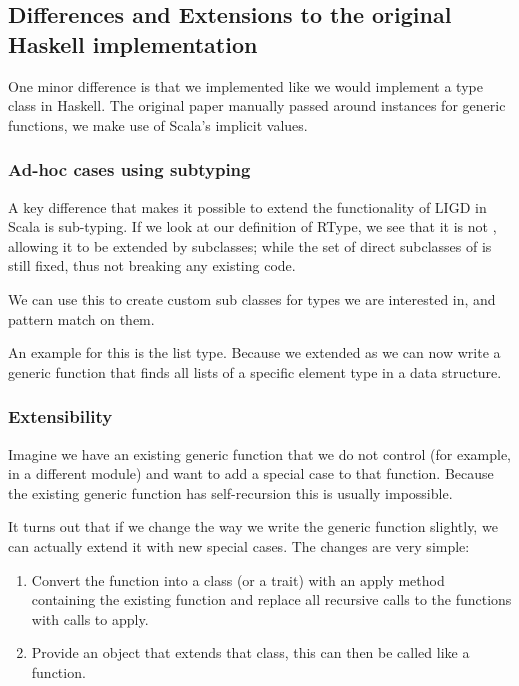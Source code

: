 \subsection{Differences and Extensions to the original Haskell implementation}
One minor difference is that we implemented  like we would implement
a type class in Haskell. The original paper manually passed around 
instances for generic functions, we make use of Scala's implicit values.


\subsubsection{Ad-hoc cases using subtyping}
A key difference that makes it possible to extend the functionality of LIGD in Scala is
sub-typing. If we look at our definition of RType, we see
that it is not , allowing it to be extended by subclasses; while the
set of direct subclasses of  is still fixed, thus not breaking any
existing code.

We can use this to create custom sub classes for types we are interested
in, and pattern match on them.

An example for this is the list type. Because we extended  as
 we can now write a generic function that finds all lists of a
specific element type in a data structure.

\subsubsection{Extensibility}
\label{lidg-extensible}
Imagine we have an existing generic function that we do not control (for example,
in a different module) and want to add a special case to that function. Because
the existing generic function has self-recursion this is usually impossible.

It turns out that if we change the way we write the generic function slightly,
we can actually extend it with new special cases. The changes are very simple:

\begin{enumerate}
  \item Convert the function into a class (or a trait) with an apply method containing the
        existing function and replace all recursive calls to the functions with
        calls to apply.
  \item Provide an object that extends that class, this can then be called like
        a function.
\end{enumerate}

